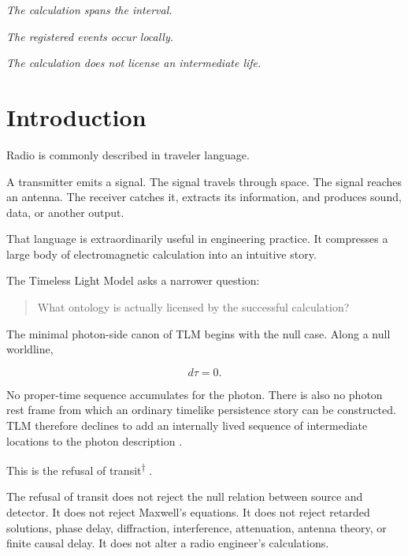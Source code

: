 \documentclass[12pt,onecolumn]{article}
\newcommand{\defterm}[2]{%
#1\textsuperscript{\textcolor{gray}{\hyperref[#2]{\scriptsize$\dagger$}}}%
}
\begin{document}
\begin{center}

\textit{The calculation spans the interval.}

\vspace{0.4em}

\textit{The registered events occur locally.}

\vspace{0.4em}

\textit{The calculation does not license an intermediate life.}

\end{center}

\section{Introduction}

Radio is commonly described in traveler language.

A transmitter emits a signal. The signal travels through space. The
signal reaches an antenna. The receiver catches it, extracts its
information, and produces sound, data, or another output.

That language is extraordinarily useful in engineering practice. It
compresses a large body of electromagnetic calculation into an intuitive
story.

The Timeless Light Model asks a narrower question:

\begin{quote}
What ontology is actually licensed by the successful calculation?
\end{quote}

The minimal photon-side canon of TLM begins with the null case. Along a
null worldline,

\[
d\tau = 0.
\]

No proper-time sequence accumulates for the photon. There is also no
photon rest frame from which an ordinary timelike persistence story can
be constructed. TLM therefore declines to add an internally lived
sequence of intermediate locations to the photon description
\cite{bedrock,retrocausality}.

This is the \defterm{refusal of transit}{def:refusal}.

The refusal of transit does not reject the null relation between source
and detector. It does not reject Maxwell's equations. It does not reject
retarded solutions, phase delay, diffraction, interference, attenuation,
antenna theory, or finite causal delay. It does not alter a radio
engineer's calculations.
\end{document}
